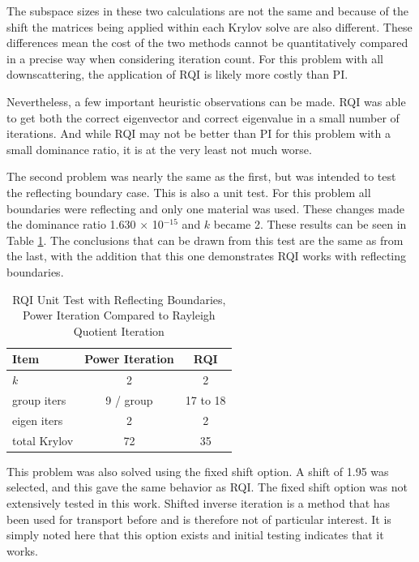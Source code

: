 The subspace sizes in these two calculations are not the same and because of the shift the matrices being applied within each Krylov solve are also different. These differences mean the cost of the two methods cannot be quantitatively compared in a precise way when considering iteration count. For this problem with all downscattering, the application of RQI is likely more costly than PI. 

Nevertheless, a few important heuristic observations can be made. RQI was able to get both the correct eigenvector and correct eigenvalue in a small number of iterations. And while RQI may not be better than PI for this problem with a small dominance ratio, it is at the very least not much worse. 

The second problem was nearly the same as the first, but was intended to test the reflecting boundary case. This is also a unit test. For this problem all boundaries were reflecting and only one material was used. These changes made the dominance ratio 1.630 $\times$ 10$^{-15}$ and $k$ became 2. These results can be seen in Table \ref{table:SmallReflectingRQI}. The conclusions that can be drawn from this test are the same as from the last, with the addition that this one demonstrates RQI works with reflecting boundaries. 
%
\begin{table}[!h]
\caption{RQI Unit Test with Reflecting Boundaries, Power Iteration Compared to Rayleigh Quotient Iteration}
\begin{center}
\begin{tabular}{| l | c | c |}
\hline
Item & Power Iteration & RQI \\[0.5ex]
\hline
$k$ & 2 & 2 \\
group iters & 9 / group   & 17 to 18 \\
eigen iters & 2 & 2 \\
total Krylov & 72 & 35 \\
\hline
\end{tabular}
\end{center}
\label{table:SmallReflectingRQI}
\end{table}

This problem was also solved using the fixed shift option. A shift of 1.95 was selected, and this gave the same behavior as RQI. The fixed shift option was not extensively tested in this work. Shifted inverse iteration is a method that has been used for transport before and is therefore not of particular interest. It is simply noted here that this option exists and initial testing indicates that it works. 

